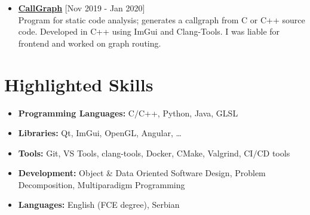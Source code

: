 \documentclass[a4paper]{moderncv}
\begin{document}
\begin{itemize}
			\item \textbf{\href{https://github.com/djordjetane/CallGraph}{CallGraph}} \hfill[Nov 2019 - Jan 2020]\\
			Program for static code analysis; generates a callgraph from C or C++ source code. Developed in C++ using 
			ImGui and Clang-Tools. I was liable for frontend and worked on graph routing.

		\end{itemize}

\section{Highlighted Skills}

	\begin{itemize}
		
		\item \textbf{Programming Languages: } C$\slash$C++, Python, Java, GLSL
		\item \textbf{Libraries: } Qt, ImGui, OpenGL, Angular, \dots
		\item \textbf{Tools: } Git, VS Tools, clang-tools, Docker, CMake, Valgrind, CI$\slash$CD tools
		\item \textbf{Development: } Object \& Data Oriented Software Design, Problem Decomposition, Multiparadigm Programming
		\item \textbf{Languages: } English (FCE degree), Serbian
		
	\end{itemize}
%
%
\end{document}
